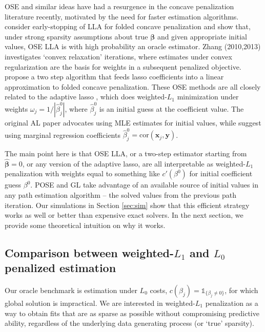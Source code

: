 \documentclass[twoside]{article}
\newcommand{\bs}[1]{\boldsymbol{#1}}
\newcommand{\mr}[1]{\mathrm{#1}}
\newcommand{\bm}[1]{\mathbf{#1}}
\newcommand{\ds}[1]{\mathds{#1}}
\begin{document}
OSE and similar ideas have had a resurgence in the concave penalization
literature recently, motivated by the need for faster estimation algorithms.
\cite{fan_strong_2014} consider early-stopping of LLA for folded concave
penalization  and show that, under strong sparsity assumptions about true
$\bs{\beta}$ and given appropriate initial values, OSE LLA is with high
probability an oracle estimator.   Zhang (2010,2013)
\nocite{zhang_analysis_2010,zhang_multi-stage_2013} investigates  
`convex relaxation' iterations, where estimates under convex regularization
 are the basis for weights in a subsequent penalized objective.
 \cite{wang_calibrating_2013} propose a two step algorithm that feeds lasso
 coefficients into a linear approximation to folded concave penalization.
 These OSE methods are all closely related to  the adaptive lasso
\citep[AL;][]{zou_adaptive_2006}, which does weighted-$L_1$ minimization under
weights $\omega_j = 1/|\hat\beta^0_j|$, where $\hat\beta^0_j$ is an initial
guess at the coefficient value.  The original AL paper advocates using MLE
estimates for initial values, while
\cite{huang_adaptive_2008} suggest using marginal regression coefficients
$\hat\beta^0_j = \mr{cor}(\bm{x}_j,\bm{y})$.

The main point here is that OSE LLA, or a two-step estimator starting from
$\bs{\hat\beta}=0$, or any version of the adaptive lasso, are all  interpretable as weighted-$L_1$ 
penalization with weights equal to something like $c'(\beta^0)$ for initial
coefficient guess $\beta^0$. POSE and GL take advantage of an  available
source of initial values in any path estimation algorithm -- the solved values
from the previous path iteration.  Our  simulations in Section \ref{sec:sim}
show that this efficient strategy works as well or better than  expensive
exact solvers.  In the next section, we provide some theoretical intuition on
why it works.


\subsection{Comparison between weighted-$L_1$ and $L_0$ penalized estimation}


Our oracle benchmark is estimation under $L_0$ costs, $c(\beta_j) =
\ds{1}_{\{\beta_j\neq0\}}$, for which global solution is impractical.   We are
interested in weighted-$L_1$ penalization as a way to obtain fits that are as
sparse as possible without compromising predictive ability, regardless of the
underlying data generating process (or `true' sparsity).
\end{document}
